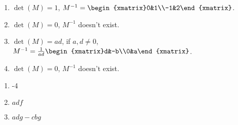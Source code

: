 \begin{exercise}{7}
  \begin{enumerate}
    \item $\det(M) = 1$, $M^{-1} = \begin{xmatrix}0&1\\-1&2\end{xmatrix}$.
    \item $\det(M) = 0$, $M^{-1}$ doesn't exist.
    \item $\det(M) = ad$, if $a, d \neq 0$, $M^{-1} = \frac{1}{ad}\begin{xmatrix}d&-b\\0&a\end{xmatrix}$.
    \item $\det(M) = 0$, $M^{-1}$ doesn't exist.
  \end{enumerate}
\end{exercise}

\begin{exercise}{8}
  \begin{enumerate}
    \item -4
    \item $adf$
    \item $adg - cbg$
  \end{enumerate}
\end{exercise}

\begin{exercise}{10}
\end{exercise}

